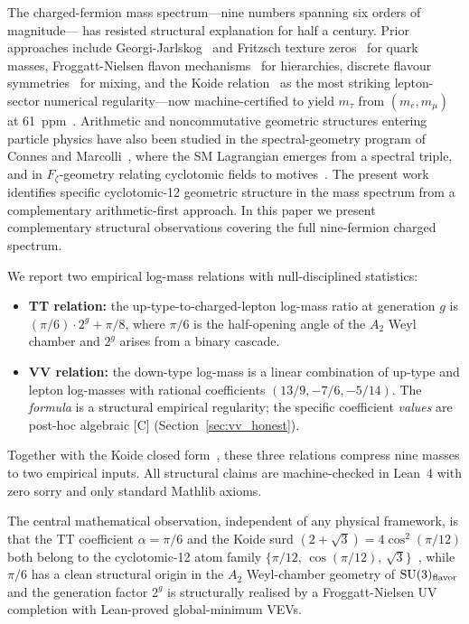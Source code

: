 \documentclass[11pt]{article}
\theoremstyle{remark}
\begin{document}
The charged-fermion mass spectrum---nine numbers spanning six orders of magnitude---
has resisted structural explanation for half a century.
Prior approaches include Georgi-Jarlskog~\cite{GeorgiJarlskog1979} and Fritzsch texture
zeros~\cite{Fritzsch1977} for quark masses, Froggatt-Nielsen flavon
mechanisms~\cite{Froggatt1979} for hierarchies, discrete flavour
symmetries~\cite{AltarelliFeruglio2010,Ishimori2010} for mixing,
and the Koide relation~\cite{Koide1983} as the most striking lepton-sector numerical
regularity---now machine-certified to yield $m_\tau$ from $(m_e,m_\mu)$
at 61~ppm~\cite{Spivack2026_Koide}.
Arithmetic and noncommutative geometric structures entering particle physics have also
been studied in the spectral-geometry program of Connes and Marcolli~\cite{ConnesMarcolli2008},
where the SM Lagrangian emerges from a spectral triple, and in $F_\zeta$-geometry
relating cyclotomic fields to motives~\cite{MarcolliManin2020}.
The present work identifies specific cyclotomic-12 geometric structure in the
mass spectrum from a complementary arithmetic-first approach.
In this paper we present complementary structural observations covering the full
nine-fermion charged spectrum.

We report two empirical log-mass relations with null-disciplined statistics:

\begin{itemize}
  \item \textbf{TT relation:} the up-type-to-charged-lepton log-mass ratio at generation $g$ is
  $(\pi/6)\cdot 2^g + \pi/8$, where $\pi/6$ is the half-opening angle of the $A_2$ Weyl
  chamber and $2^g$ arises from a binary cascade.
  \item \textbf{VV relation:} the down-type log-mass is a linear combination of up-type and
  lepton log-masses with rational coefficients $(13/9,-7/6,-5/14)$.  The
  \emph{formula} is a structural empirical regularity; the specific coefficient
  \emph{values} are post-hoc algebraic [C] (Section~\ref{sec:vv_honest}).
\end{itemize}

Together with the Koide closed form~\cite{Spivack2026_Koide}, these three relations compress
nine masses to two empirical inputs.  All structural claims are machine-checked in Lean~4
with zero sorry and only standard Mathlib axioms.

The central mathematical observation, independent of any physical framework, is that the
TT coefficient $\alpha=\pi/6$ and the Koide surd $(2+\sqrt{3})=4\cos^2(\pi/12)$ both
belong to the cyclotomic-12 atom family $\{\pi/12,\,\cos(\pi/12),\,\sqrt{3}\}$~\cite{Spivack2026_Koide},
while $\pi/6$ has a clean structural origin in the $A_2$ Weyl-chamber geometry of
$\mathrm{SU}(3)_{\rm flavor}$ and the generation factor $2^g$ is structurally
realised by a Froggatt-Nielsen UV completion with Lean-proved global-minimum VEVs.
\end{document}
